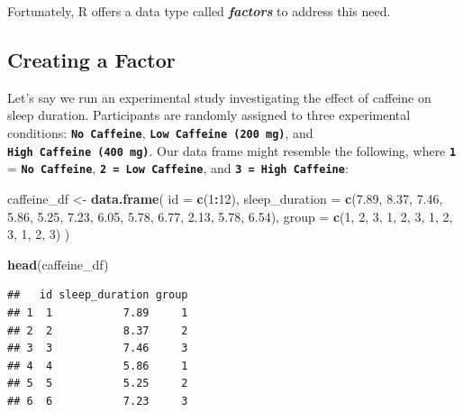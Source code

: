 \documentclass[
]{book}
\newenvironment{Shaded}{\begin{snugshade}}{\end{snugshade}}
\newcommand{\AttributeTok}[1]{\textcolor[rgb]{0.13,0.29,0.53}{#1}}
\newcommand{\DecValTok}[1]{\textcolor[rgb]{0.00,0.00,0.81}{#1}}
\newcommand{\FloatTok}[1]{\textcolor[rgb]{0.00,0.00,0.81}{#1}}
\newcommand{\FunctionTok}[1]{\textcolor[rgb]{0.13,0.29,0.53}{\textbf{#1}}}
\newcommand{\NormalTok}[1]{#1}
\newcommand{\OtherTok}[1]{\textcolor[rgb]{0.56,0.35,0.01}{#1}}
\newcommand{\SpecialCharTok}[1]{\textcolor[rgb]{0.81,0.36,0.00}{\textbf{#1}}}
\begin{document}
Fortunately, R offers a data type called \textbf{\emph{factors}} to address this need.

\hypertarget{creating-a-factor}{%
\subsection{Creating a Factor}\label{creating-a-factor}}

Let's say we run an experimental study investigating the effect of caffeine on sleep duration. Participants are randomly assigned to three experimental conditions: \textbf{\texttt{No\ Caffeine}}, \textbf{\texttt{Low\ Caffeine\ (200\ mg)}}, and \textbf{\texttt{High\ Caffeine\ (400\ mg)}}. Our data frame might resemble the following, where \textbf{\texttt{1}} = \textbf{\texttt{No\ Caffeine}}, \textbf{\texttt{2\ =\ Low\ Caffeine}}, and \textbf{\texttt{3\ =\ High\ Caffeine}}:

\begin{Shaded}
\begin{Highlighting}[]
\NormalTok{caffeine\_df }\OtherTok{\textless{}{-}} \FunctionTok{data.frame}\NormalTok{(}
  \AttributeTok{id =} \FunctionTok{c}\NormalTok{(}\DecValTok{1}\SpecialCharTok{:}\DecValTok{12}\NormalTok{),}
  \AttributeTok{sleep\_duration =} \FunctionTok{c}\NormalTok{(}\FloatTok{7.89}\NormalTok{, }\FloatTok{8.37}\NormalTok{, }\FloatTok{7.46}\NormalTok{, }\FloatTok{5.86}\NormalTok{, }\FloatTok{5.25}\NormalTok{, }\FloatTok{7.23}\NormalTok{, }\FloatTok{6.05}\NormalTok{, }\FloatTok{5.78}\NormalTok{, }\FloatTok{6.77}\NormalTok{, }\FloatTok{2.13}\NormalTok{, }\FloatTok{5.78}\NormalTok{,  }\FloatTok{6.54}\NormalTok{),}
  \AttributeTok{group =} \FunctionTok{c}\NormalTok{(}\DecValTok{1}\NormalTok{, }\DecValTok{2}\NormalTok{, }\DecValTok{3}\NormalTok{, }\DecValTok{1}\NormalTok{, }\DecValTok{2}\NormalTok{, }\DecValTok{3}\NormalTok{, }\DecValTok{1}\NormalTok{, }\DecValTok{2}\NormalTok{, }\DecValTok{3}\NormalTok{, }\DecValTok{1}\NormalTok{, }\DecValTok{2}\NormalTok{, }\DecValTok{3}\NormalTok{)}
\NormalTok{)}

\FunctionTok{head}\NormalTok{(caffeine\_df)}
\end{Highlighting}
\end{Shaded}

\begin{verbatim}
##   id sleep_duration group
## 1  1           7.89     1
## 2  2           8.37     2
## 3  3           7.46     3
## 4  4           5.86     1
## 5  5           5.25     2
## 6  6           7.23     3
\end{verbatim}
\end{document}
